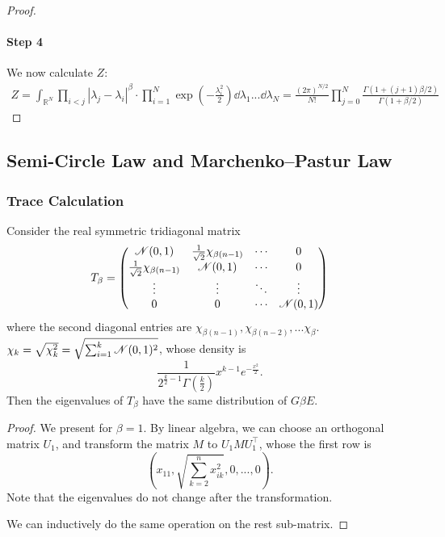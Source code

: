 \begin{proof}
    \paragraph{Step 4}  We now calculate $Z$:
    \begin{align*}
        Z = \int_{\mathbb{R}^N} \prod_{i<j}|\lambda_j-\lambda_i|^\beta \cdot \prod_{i=1}^N\exp(-\frac{\lambda_i^2}{2}) \dd \lambda_{1}...\dd \lambda_{N} = 
        \frac{(2\pi)^{N/2}}{N!} \prod_{j=0}^N \frac{\Gamma(1+(j+1)\beta/2)}{\Gamma(1+\beta/2)}
    \end{align*}
\end{proof}

\subsection{Semi-Circle Law and Marchenko–Pastur Law}
\subsubsection{Trace Calculation}
\begin{thm}
    Consider the real symmetric tridiagonal matrix
    \[
    T_{\beta} = 
    \begin{pmatrix}
    \mathcal{N}(0,1) & \frac{1}{\sqrt{2}}\chi_{\beta(n-1)} & \cdots & 0 \\
    \frac{1}{\sqrt{2}}\chi_{\beta(n-1)} & \mathcal{N}(0,1) & \cdots & 0 \\
    \vdots & \vdots & \ddots & \vdots \\
    0 & 0 & \cdots & \mathcal{N}(0,1)
    \end{pmatrix}
    \]
    where the second diagonal entries are $\chi_{\beta(n-1)}, \chi_{\beta(n-2)},... \chi_{\beta}$.
    $\chi_k = \sqrt{\chi_k^2} = \sqrt{\sum_{i=1}^k \mathcal{N}(0,1)^2}$, whose density is
    \[
    \frac{1}{2^{\frac{k}{2}-1}\Gamma(\frac{k}{2})}x^{k-1}e^{-\frac{x^2}{2}}.
    \]
    Then the eigenvalues of $T_\beta$ have the same distribution of $G\beta E$.
\end{thm}

\begin{proof}
    We present for $\beta = 1$. By linear algebra, we can choose an orthogonal matrix $U_1$, and transform the matrix $M$ to $U_1MU_1^\top$, whose the first row is 
    \[
    (x_{11}, \sqrt{\sum_{k=2}^n x_{ik}^2}, 0,...,0).
    \]
    Note that the eigenvalues do not change after the transformation.
    
    We can inductively do the same operation on the rest sub-matrix.
\end{proof}

